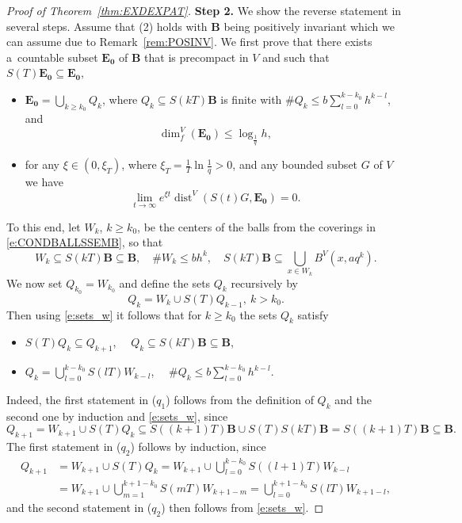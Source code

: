 \documentclass[a4paper,12pt,reqno]{amsart}
\theoremstyle{plain}
\theoremstyle{definition}
\numberwithin{equation}{section}
\newcommand{\dist}{\operatorname{dist}}
\newcommand{\dimf}{\operatorname{dim}_{f}}
\renewcommand{\geq}{\geqslant}
\renewcommand{\leq}{\leqslant}
\begin{document}
\begin{proof}[Proof of Theorem~\ref{thm:EXDEXPAT}]
\textbf{Step 2.} 
We show the reverse statement in several steps. Assume that (2) holds with $\mathbf{B}$ being positively invariant which we can assume  due to Remark~\ref{rem:POSINV}.  We first prove that there exists a~countable subset $\mathbf{E_0}$ of $\mathbf{B}$ that 
is precompact in $V$ and such that $S(T)\mathbf{E_0}\subseteq \mathbf{E_0}$,
\begin{itemize}
\item[($e_1$)] $\displaystyle\mathbf{E_0}=\bigcup_{k\geq k_0}Q_{k}$,
where $Q_{k}\subseteq S(kT)\mathbf{B}$ is finite with $\displaystyle\# Q_{k}\leq b\sum_{l=0}^{k-k_0}h^{k-l}$, and
\begin{equation*}
\dimf^{V}(\mathbf{E_0})\leq\log_{\frac{1}{q}}h,
\end{equation*}
\item[($e_2$)] for any $\xi\in(0,\xi_{T})$, where $\xi_T=\frac{1}{T}\ln\frac{1}{q}>0$,
and any bounded subset $G$ of $V$ we have
\begin{equation*}
\lim_{t\rightarrow\infty}e^{\xi t}\dist^{V}(S(t)G,\mathbf{E_0})=0.
\end{equation*}
\end{itemize}
To this end, let $W_{k}$, $k\geq k_0$, be the centers of the balls from the coverings in \eqref{e:CONDBALLSSEMB}, so that
\begin{equation}\label{e:sets_w}
W_{k}\subseteq S(kT)\mathbf{B}\subseteq\mathbf{B},\quad 
\# W_{k}\leq b\displaystyle h^{k}, \quad 
\displaystyle S(kT)\mathbf{B}\subseteq\bigcup_{x\in W_{k}}B^{V}(x, a q^k).
\end{equation}
We now set $Q_{k_0}=W_{k_0}$ and define the sets $Q_k$ recursively by
$$Q_{k}=W_{k}\cup S(T)Q_{k-1},\ k>k_0.$$
Then using \eqref{e:sets_w} it follows that for $k\geq k_0$ the sets $Q_{k}$ satisfy
\begin{itemize}
\item[($q_1$)] $S(T)Q_{k}\subseteq Q_{k+1}$, $\quad Q_{k}\subseteq S(kT)\mathbf{B}\subseteq\mathbf{B}$,
\item[($q_2$)] $\displaystyle Q_{k}=\bigcup_{l=0}^{k-k_0}S(lT)W_{k-l}$,
$\quad\displaystyle\# Q_{k}\leq b\sum_{l=0}^{k-k_0}h^{k-l}$.
\end{itemize}
Indeed, the first statement in ($q_1$) follows from the definition of $Q_{k}$
and the second one by induction and \eqref{e:sets_w}, since
$$Q_{k+1}=W_{k+1}\cup S(T)Q_{k}\subseteq S((k+1)T)\mathbf{B}\cup S(T)S(kT)\mathbf{B}=S((k+1)T)\mathbf{B}\subseteq \mathbf{B}.$$
The first statement in ($q_2$) follows by induction, since
\begin{equation*}
\begin{split}
Q_{k+1}&=W_{k+1}\cup S(T)Q_{k}=W_{k+1}\cup\bigcup_{l=0}^{k-k_0}S((l+1)T)W_{k-l}\\
&=W_{k+1}\cup\bigcup_{m=1}^{k+1-k_0}S(mT)W_{k+1-m}=\bigcup_{l=0}^{k+1-k_0}S(lT)W_{k+1-l},
\end{split}
\end{equation*}
and the second statement in ($q_2$) then follows from \eqref{e:sets_w}.


\end{proof}
\end{document}
